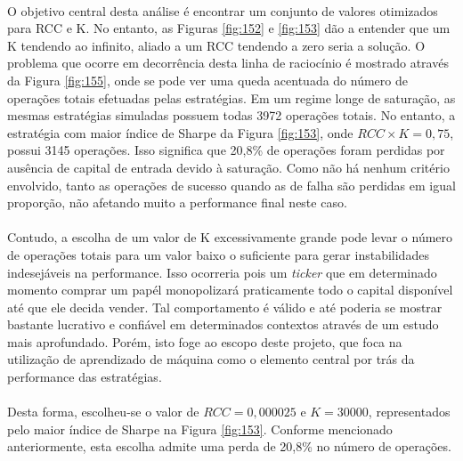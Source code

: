 \paragraph{} O objetivo central desta análise é encontrar um conjunto de valores otimizados para RCC e K. No entanto, as Figuras \ref{fig:152} e \ref{fig:153} dão a entender que um K tendendo ao infinito, aliado a um RCC tendendo a zero seria a solução. O problema que ocorre em decorrência desta linha de raciocínio é mostrado através da Figura \ref{fig:155}, onde se pode ver uma queda acentuada do número de operações totais efetuadas pelas estratégias. Em um regime longe de saturação, as mesmas estratégias simuladas possuem todas 3972 operações totais. No entanto, a estratégia com maior índice de Sharpe da Figura \ref{fig:153}, onde \begin{math} RCC \times K = 0,75 \end{math}, possui 3145 operações. Isso significa que 20,8\% de operações foram perdidas por ausência de capital de entrada devido à saturação. Como não há nenhum critério envolvido, tanto as operações de sucesso quando as de falha são perdidas em igual proporção, não afetando muito a performance final neste caso.

\paragraph{} Contudo, a escolha de um valor de K excessivamente grande pode levar o número de operações totais para um valor baixo o suficiente para gerar instabilidades indesejáveis na performance. Isso ocorreria pois um \textit{ticker} que em determinado momento comprar um papél monopolizará praticamente todo o capital disponível até que ele decida vender. Tal comportamento é válido e até poderia se mostrar bastante lucrativo e confiável em determinados contextos através de um estudo mais aprofundado. Porém, isto foge ao escopo deste projeto, que foca na utilização de aprendizado de máquina como o elemento central por trás da performance das estratégias.

\paragraph{} Desta forma, escolheu-se o valor de \begin{math} RCC = 0,000025 \end{math} e \begin{math} K = 30000 \end{math}, representados pelo maior índice de Sharpe na Figura \ref{fig:153}. Conforme mencionado anteriormente, esta escolha admite uma perda de 20,8\% no número de operações.

